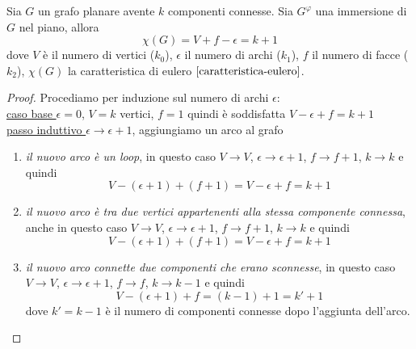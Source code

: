 \begin{teorema}\label{eulero-generica}
    Sia \(G\) un grafo planare avente \(k\) componenti connesse. Sia \(G^\varphi\) una immersione di \(G\) nel piano, allora
    \begin{equation}
        \chi(G)=V+f-\epsilon = k+1
    \end{equation}
    dove \(V\) è il numero di vertici (\(k_0\)), \(\epsilon\) il numero di archi (\(k_1\)), \(f\) il numero di facce (\(k_2\)), \(\chi(G)\) la caratteristica di eulero \(\ref{caratteristica-eulero}\).
    \begin{proof}
        Procediamo per induzione sul numero di archi \( \epsilon \): \smallskip \\
        \underline{caso base \(\epsilon=0\)}, \(V=k\) vertici, \(f=1\) quindi è soddisfatta \(V-\epsilon+f = k+1\)\smallskip \\
        \underline{passo induttivo \(\epsilon \to \epsilon + 1\)}, aggiungiamo un arco al grafo
        \begin{enumerate}
            \item \textit{il nuovo arco è un loop}, in questo caso \(V \to V\), \(\epsilon \to \epsilon +1\), \(f \to f+1\), \(k \to k\) e quindi
                  \begin{equation}
                      V-(\epsilon+1)+(f+1)=V-\epsilon+f=k+1
                  \end{equation}
            \item \textit{il nuovo arco è tra due vertici appartenenti alla stessa componente connessa}, anche in questo caso \(V \to V\), \(\epsilon \to \epsilon +1\), \(f \to f+1\), \(k \to k\) e quindi
                  \begin{equation}
                      V-(\epsilon+1)+(f+1)=V-\epsilon+f=k+1
                  \end{equation}
            \item \textit{il nuovo arco connette due componenti che erano sconnesse}, in questo caso \(V \to V\), \(\epsilon \to \epsilon +1\), \(f \to f\), \(k \to k-1\) e quindi
                  \begin{equation}
                      V-(\epsilon +1)+f = (k-1) + 1 = k'+1
                  \end{equation}
                  dove \(k'=k-1\) è il numero di componenti connesse dopo l'aggiunta dell'arco.
        \end{enumerate}
    \end{proof}
\end{teorema}
